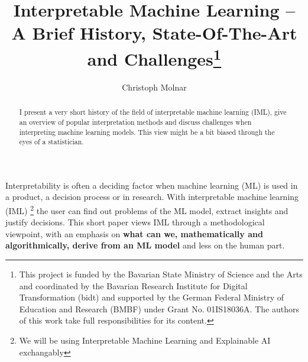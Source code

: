 \documentclass[runningheads]{llncs}
\begin{document}
%
\title{Interpretable Machine Learning -- A Brief History, State-Of-The-Art and Challenges\thanks{This project is funded by the Bavarian State Ministry of Science and the Arts and coordinated by the Bavarian Research Institute for Digital Transformation (bidt) and supported by the German Federal Ministry of Education and Research (BMBF) under Grant No. 01IS18036A.
The authors of this work take full responsibilities for its content.
}}
%
%
\author{Christoph Molnar}
%
%
%
\maketitle              %
%
\begin{abstract}
  I present a very short history of the field of interpretable machine learning (IML), give an overview of popular interpretation methods and discuss challenges when interpreting machine learning models.
  This view might be a bit biased through the eyes of a statistician.

\end{abstract}
%
%
Interpretability is often a deciding factor when machine learning (ML) is used in a product, a decision process or in research.
With interpretable machine learning (IML) \footnote{We will be using Interpretable Machine Learning and Explainable AI exchangably} the user can find out problems of the ML model, extract insights and justify decisions.
This short paper views IML through a methodological viewpoint, with an emphasis on \textbf{what can we, mathematically and algorithmically, derive from an ML model} and less on the human part.
\end{document}

